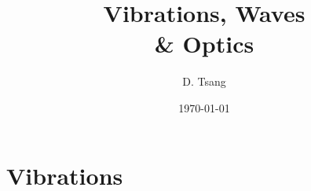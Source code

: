 \documentclass[openany, a4paper, notoc, skeletal]{TsangNotes}
\title{%
Vibrations, Waves\\
\noindent \& Optics} %
\author{D. Tsang} %
\date{\today}
\begin{document}
\mainmatter
\maketitle %



\part{Vibrations}
 


\backmatter
\end{document}
